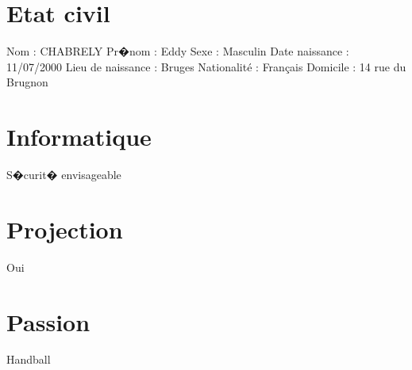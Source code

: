 \documentclass{article}
\begin{document}
\section{Etat civil}
Nom : CHABRELY
\newline
Pr�nom : Eddy
\newline
Sexe : Masculin
\newline
Date naissance : 11/07/2000
\newline
Lieu de naissance : Bruges 
\newline
Nationalité : Français
\newline
Domicile : 14 rue du Brugnon


\section{Informatique}
S�curit� envisageable

\section{Projection}
Oui

\section{Passion}
Handball
\end{document}
